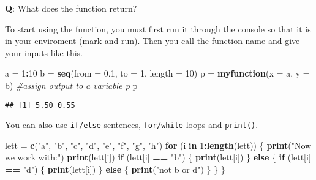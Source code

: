 \documentclass[]{article}
\newenvironment{Shaded}{\begin{snugshade}}{\end{snugshade}}
\newcommand{\KeywordTok}[1]{\textcolor[rgb]{0.13,0.29,0.53}{\textbf{#1}}}
\newcommand{\DataTypeTok}[1]{\textcolor[rgb]{0.13,0.29,0.53}{#1}}
\newcommand{\DecValTok}[1]{\textcolor[rgb]{0.00,0.00,0.81}{#1}}
\newcommand{\FloatTok}[1]{\textcolor[rgb]{0.00,0.00,0.81}{#1}}
\newcommand{\StringTok}[1]{\textcolor[rgb]{0.31,0.60,0.02}{#1}}
\newcommand{\CommentTok}[1]{\textcolor[rgb]{0.56,0.35,0.01}{\textit{#1}}}
\newcommand{\ControlFlowTok}[1]{\textcolor[rgb]{0.13,0.29,0.53}{\textbf{#1}}}
\newcommand{\OperatorTok}[1]{\textcolor[rgb]{0.81,0.36,0.00}{\textbf{#1}}}
\newcommand{\NormalTok}[1]{#1}
\begin{document}
\textbf{Q}: What does the function return?

To start using the function, you must first run it through the console
so that it is in your enviroment (mark and run). Then you call the
function name and give your inputs like this.

\begin{Shaded}
\begin{Highlighting}[]
\NormalTok{a =}\StringTok{ }\DecValTok{1}\OperatorTok{:}\DecValTok{10}
\NormalTok{b =}\StringTok{ }\KeywordTok{seq}\NormalTok{(}\DataTypeTok{from =} \FloatTok{0.1}\NormalTok{, }\DataTypeTok{to =} \DecValTok{1}\NormalTok{, }\DataTypeTok{length =} \DecValTok{10}\NormalTok{)}
\NormalTok{p =}\StringTok{ }\KeywordTok{myfunction}\NormalTok{(}\DataTypeTok{x =}\NormalTok{ a, }\DataTypeTok{y =}\NormalTok{ b)  }\CommentTok{#assign output to a variable p}
\NormalTok{p}
\end{Highlighting}
\end{Shaded}

\begin{verbatim}
## [1] 5.50 0.55
\end{verbatim}

You can also use \texttt{if/else} sentences, \texttt{for/while}-loops
and \texttt{print()}.

\begin{Shaded}
\begin{Highlighting}[]
\NormalTok{lett =}\StringTok{ }\KeywordTok{c}\NormalTok{(}\StringTok{"a"}\NormalTok{, }\StringTok{"b"}\NormalTok{, }\StringTok{"c"}\NormalTok{, }\StringTok{"d"}\NormalTok{, }\StringTok{"e"}\NormalTok{, }\StringTok{"f"}\NormalTok{, }\StringTok{"g"}\NormalTok{, }\StringTok{"h"}\NormalTok{)}
\ControlFlowTok{for}\NormalTok{ (i }\ControlFlowTok{in} \DecValTok{1}\OperatorTok{:}\KeywordTok{length}\NormalTok{(lett)) \{}
    \KeywordTok{print}\NormalTok{(}\StringTok{"Now we work with:"}\NormalTok{)}
    \KeywordTok{print}\NormalTok{(lett[i])}
    \ControlFlowTok{if}\NormalTok{ (lett[i] }\OperatorTok{==}\StringTok{ "b"}\NormalTok{) \{}
        \KeywordTok{print}\NormalTok{(lett[i])}
\NormalTok{    \} }\ControlFlowTok{else}\NormalTok{ \{}
        \ControlFlowTok{if}\NormalTok{ (lett[i] }\OperatorTok{==}\StringTok{ "d"}\NormalTok{) \{}
            \KeywordTok{print}\NormalTok{(lett[i])}
\NormalTok{        \} }\ControlFlowTok{else}\NormalTok{ \{}
            \KeywordTok{print}\NormalTok{(}\StringTok{"not b or d"}\NormalTok{)}
\NormalTok{        \}}
\NormalTok{    \}}
\NormalTok{\}}
\end{Highlighting}
\end{Shaded}
\end{document}
